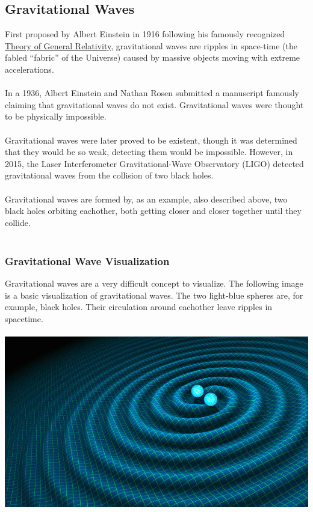 \documentclass{article}
\begin{document}
\subsection{Gravitational Waves}
First proposed by Albert Einstein in 1916 following his famously recognized \hyperref[sec:generalrelativity]{Theory of General Relativity}, gravitational waves are ripples in space-time (the fabled “fabric” of the Universe) caused by massive objects moving with extreme accelerations.\\\\
In a 1936, Albert Einstein and Nathan Rosen submitted a manuscript famously claiming that gravitational waves do not exist. Gravitational waves were thought to be physically impossible. \\\\
Gravitational waves were later proved to be existent, though it was determined that they would be so weak, detecting them would be impossible. However, in 2015, the Laser Interferometer Gravitational-Wave Observatory (LIGO) detected gravitational waves from the collision of two black holes.\\\\
Gravitational waves are formed by, as an example, also described above, two black holes orbiting eachother, both getting closer and closer together until they collide.\\\\

\subsubsection{Gravitational Wave Visualization}
Gravitational waves are a very difficult concept to visualize. The following image is a basic visualization of gravitational waves. The two light-blue spheres are, for example, black holes. Their circulation around eachother leave ripples in spacetime.\\\\
\includegraphics[scale=0.33]{images/gravitational_waves.png}
\end{document}

